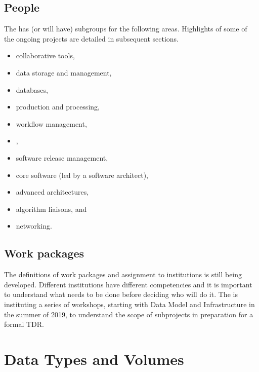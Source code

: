 \subsection{People}

The  has (or will have) subgroups for the following areas.  Highlights of some of the ongoing projects are detailed in subsequent sections. 

\begin{itemize}
    \item collaborative tools,
\item data storage and management,
\item databases,
\item production and processing, 
\item workflow management,
\item {},
\item software release management, 
\item core software (led by a software architect),
\item advanced architectures,
\item algorithm liaisons, and 
\item networking.
\end{itemize}

\subsection{Work packages}
The definitions of work packages and assignment to institutions is still being developed. Different institutions have different competencies and it is important to understand what needs to be done before deciding who will do it.  The  is instituting a series of workshops, starting with Data Model and Infrastructure in the summer of 2019, to understand the scope of subprojects in preparation for a formal TDR. 

\section{Data Types and Volumes}


